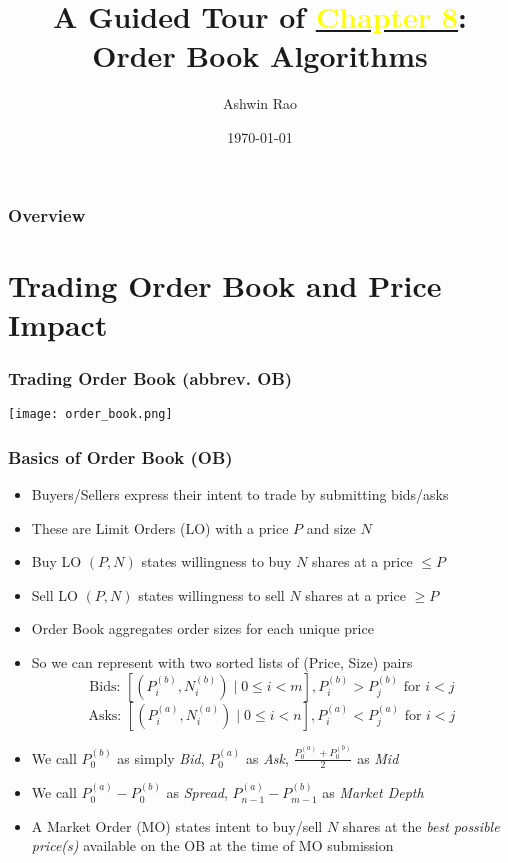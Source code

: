 \documentclass[handout]{beamer}
\title[Order Book Algos Chapter]{A Guided Tour of \href{http://stanford.edu/~ashlearn/RLForFinanceBook/book.pdf}{\underline{\textcolor{yellow}{Chapter 8}}}: \\ Order Book Algorithms} %
\author{Ashwin Rao} %
\institute[Stanford] %
{
ICME, Stanford University
}
\date{\today} %
\begin{document}
\begin{frame}
\titlepage %
\end{frame}

\begin{frame}
\frametitle{Overview} %
\tableofcontents %
\end{frame}

\section{Trading Order Book and Price Impact}

\begin{frame}
\frametitle{Trading Order Book (abbrev. OB)}
\texttt{[image: order\_book.png]}
\end{frame}

\begin{frame}
\frametitle{Basics of Order Book (OB)}
\pause
\begin{itemize}[<+->]
\item Buyers/Sellers express their intent to trade by submitting bids/asks
\item These are Limit Orders (LO) with a price $P$ and size $N$
\item Buy LO $(P, N)$ states willingness to buy $N$ shares at a price $\leq P$
\item Sell  LO $(P, N)$ states willingness to sell $N$ shares at a price $\geq P$
\item Order Book aggregates order sizes for each unique price
\item So we can represent with two sorted lists of (Price, Size) pairs
$$\mbox{Bids: } [(P_i^{(b)}, N_i^{(b)}) \mid 0 \leq i < m], P_i^{(b)} > P_j^{(b)} \mbox{ for } i < j$$
$$\mbox{Asks: } [(P_i^{(a)}, N_i^{(a)}) \mid 0 \leq i < n], P_i^{(a)} < P_j^{(a)} \mbox{ for } i < j$$
\item We call $P_0^{(b)}$ as simply {\em Bid}, $P_0^{(a)}$ as {\em Ask}, $\frac {P_0^{(a)} + P_0^{(b)}} 2$ as {\em Mid}
\item We call $P_0^{(a)} - P_0^{(b)}$ as {\em Spread}, $P_{n-1}^{(a)} - P_{m-1}^{(b)}$ as {\em Market Depth}
\item A Market Order (MO) states intent to buy/sell $N$ shares at the {\em best possible price(s)} available on the OB at the time of MO submission
\end{itemize}
\end{frame}
\end{document}
